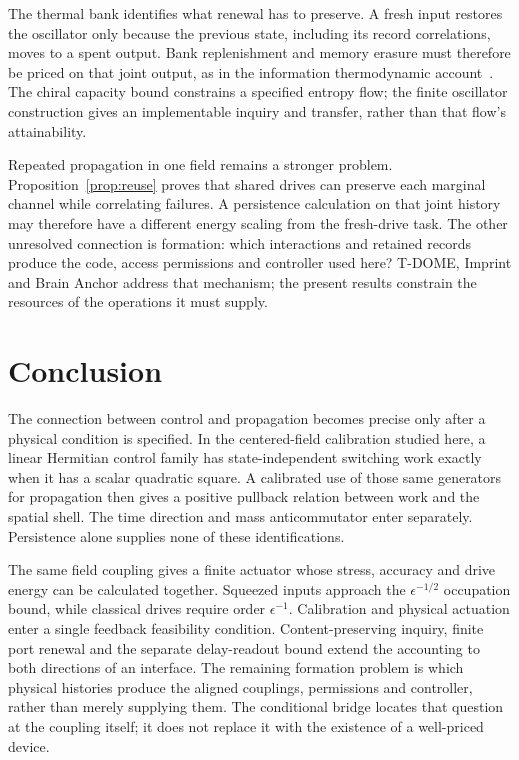 \documentclass[aps,pre,onecolumn,superscriptaddress,floatfix,longbibliography]{revtex4-2}
\begin{document}
The thermal bank identifies what renewal has to preserve. A fresh input
restores the oscillator only because the previous state, including its
record correlations, moves to a spent output. Bank replenishment and memory
erasure must therefore be priced on that joint output, as in the information
thermodynamic account~\cite{Sagawa2012,Parrondo2015}. The chiral capacity bound
constrains a specified entropy flow; the finite oscillator construction gives
an implementable inquiry and transfer, rather than that flow's attainability.

Repeated propagation in one field remains a stronger problem.
Proposition~\ref{prop:reuse} proves that shared drives can preserve each
marginal channel while correlating failures. A persistence calculation on
that joint history may therefore have a different energy scaling from the
fresh-drive task. The other unresolved connection is formation: which
interactions and retained records produce the code, access permissions and
controller used here? T-DOME, Imprint and Brain Anchor address that mechanism;
the present results constrain the resources of the operations it must supply.

\section{Conclusion}

The connection between control and propagation becomes precise only after
a physical condition is specified. In the centered-field calibration
studied here, a linear Hermitian control family has state-independent
switching work exactly when it has a scalar quadratic square.
A calibrated use of those same generators for propagation then gives
a positive pullback relation between work and the spatial shell.
The time direction and mass anticommutator enter separately.
Persistence alone supplies none of these identifications.

The same field coupling gives a finite actuator whose stress, accuracy
and drive energy can be calculated together. Squeezed inputs approach
the $\epsilon^{-1/2}$ occupation bound, while classical drives require
order $\epsilon^{-1}$. Calibration and physical actuation enter a single
feedback feasibility condition. Content-preserving inquiry, finite port
renewal and the separate delay-readout bound extend the accounting to
both directions of an interface. The remaining formation problem is
which physical histories produce the aligned couplings, permissions and
controller, rather than merely supplying them. The conditional bridge
locates that question at the coupling itself; it does not replace it
with the existence of a well-priced device.
\end{document}
